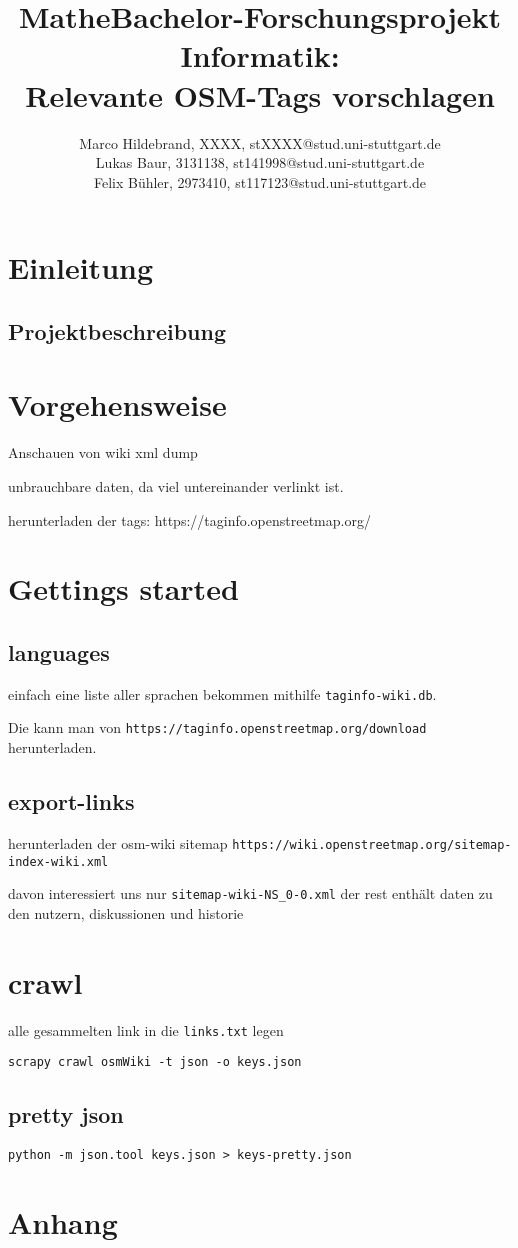 \documentclass[12pt,pdftex,a4paper]{article}
\title{Mathe}
\begin{document}
\title{Bachelor-Forschungsprojekt Informatik:\\Relevante OSM-Tags vorschlagen}
\author{Marco Hildebrand, XXXX, stXXXX@stud.uni-stuttgart.de\\
		Lukas Baur, 3131138, st141998@stud.uni-stuttgart.de\\
		Felix Bühler, 2973410, st117123@stud.uni-stuttgart.de}
\maketitle

\section{Einleitung}
\subsection{Projektbeschreibung}

\pagebreak
\section{Vorgehensweise}
Anschauen von wiki xml dump

unbrauchbare daten, da viel untereinander verlinkt ist.

herunterladen der tags: https://taginfo.openstreetmap.org/

\section{Gettings started}
\subsection{languages}
einfach eine liste aller sprachen bekommen mithilfe \texttt{taginfo-wiki.db}.

Die kann man von \texttt{https://taginfo.openstreetmap.org/download} herunterladen.

\subsection{export-links}
herunterladen der osm-wiki sitemap
\texttt{https://wiki.openstreetmap.org/sitemap-index-wiki.xml}


davon interessiert uns nur \texttt{sitemap-wiki-NS\_0-0.xml} der rest enthält daten zu den nutzern, diskussionen und historie

\section{crawl}
alle gesammelten link in die \texttt{links.txt} legen

\texttt{scrapy crawl osmWiki -t json -o keys.json}

\subsection{pretty json}
\texttt{python -m json.tool keys.json > keys-pretty.json}


\pagebreak
\section{Anhang}
\end{document}
